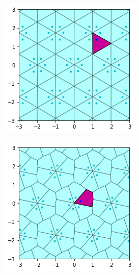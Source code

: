 \documentclass[12pt]{report}
\begin{document}
  \begin{figure}[H]
  \begin{subfigure}[b]{0.3\textwidth}
    \includegraphics[width=\textwidth]{output_10_0.png}
    \label{fig:f1}
  \end{subfigure}
  \begin{subfigure}[b]{0.3\textwidth}
    \includegraphics[width=\textwidth]{output_13_0.png}

\end{subfigure}
\end{figure}
\end{document}
